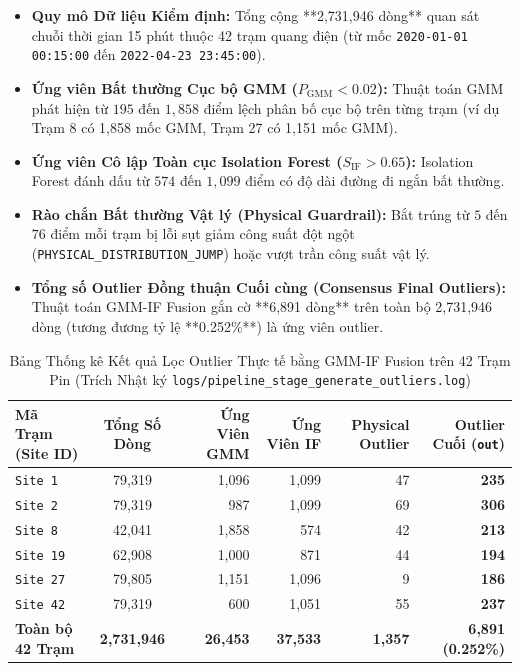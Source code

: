 \documentclass[12pt,a4paper]{article}
\begin{document}
\begin{itemize}
    \item \textbf{Quy mô Dữ liệu Kiểm định:} Tổng cộng **2,731,946 dòng** quan sát chuỗi thời gian 15 phút thuộc 42 trạm quang điện (từ mốc \texttt{2020-01-01 00:15:00} đến \texttt{2022-04-23 23:45:00}).
    \item \textbf{Ứng viên Bất thường Cục bộ GMM ($P_{\text{GMM}} < 0.02$):} Thuật toán GMM phát hiện từ $195$ đến $1,858$ điểm lệch phân bố cục bộ trên từng trạm (ví dụ Trạm 8 có 1,858 mốc GMM, Trạm 27 có 1,151 mốc GMM).
    \item \textbf{Ứng viên Cô lập Toàn cục Isolation Forest ($S_{\text{IF}} > 0.65$):} Isolation Forest đánh dấu từ $574$ đến $1,099$ điểm có độ dài đường đi ngắn bất thường.
    \item \textbf{Rào chắn Bất thường Vật lý (Physical Guardrail):} Bắt trúng từ $5$ đến $76$ điểm mỗi trạm bị lỗi sụt giảm công suất đột ngột\\(\texttt{PHYSICAL\_\allowbreak DISTRIBUTION\_\allowbreak JUMP}) hoặc vượt trần công suất vật lý.
    \item \textbf{Tổng số Outlier Đồng thuận Cuối cùng (Consensus Final Outliers):} Thuật toán GMM-IF Fusion gắn cờ **6,891 dòng** trên toàn bộ 2,731,946 dòng (tương đương tỷ lệ **0.252\%**) là ứng viên outlier.
\end{itemize}

\begin{table}[htbp]
\centering
\caption{Bảng Thống kê Kết quả Lọc Outlier Thực tế bằng GMM-IF Fusion trên 42 Trạm Pin (Trích Nhật ký \texttt{logs/pipeline\_stage\_generate\_outliers.log})}
\label{tab:gmm_if_log_results}
\begin{tabularx}{\linewidth}{l c r r r r}
\toprule
\textbf{Mã Trạm (Site ID)} & \textbf{Tổng Số Dòng} & \textbf{Ứng Viên GMM} & \textbf{Ứng Viên IF} & \textbf{Physical Outlier} & \textbf{Outlier Cuối (\texttt{out})} \\
\midrule
\texttt{Site 1}  & 79,319 & 1,096 & 1,099 & 47 & \textbf{235} \\
\texttt{Site 2}  & 79,319 &   987 & 1,099 & 69 & \textbf{306} \\
\texttt{Site 8}  & 42,041 & 1,858 &   574 & 42 & \textbf{213} \\
\texttt{Site 19} & 62,908 & 1,000 &   871 & 44 & \textbf{194} \\
\texttt{Site 27} & 79,805 & 1,151 & 1,096 &  9 & \textbf{186} \\
\texttt{Site 42} & 79,319 &   600 & 1,051 & 55 & \textbf{237} \\
\midrule
\textbf{Toàn bộ 42 Trạm} & \textbf{2,731,946} & \textbf{26,453} & \textbf{37,533} & \textbf{1,357} & \textbf{6,891 (0.252\%)} \\
\bottomrule
\end{tabularx}
\end{table}
\end{document}
